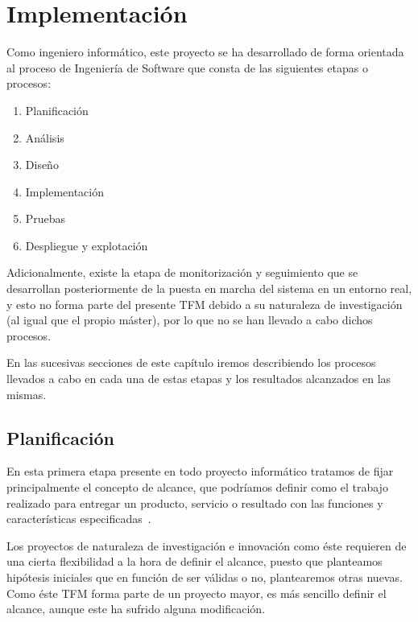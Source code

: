\graphicspath{{capitulos/Capitulo4-Implementacion/recursos/}}

\section{Implementación} \label{capitulo:4}

Como ingeniero informático, este proyecto se ha desarrollado de forma orientada al proceso de Ingeniería de Software que consta de las siguientes etapas o procesos: 
\begin{enumerate}
	\item Planificación
	\item Análisis
	\item Diseño
	\item Implementación%
	\item Pruebas
	\item Despliegue y explotación    
\end{enumerate}
Adicionalmente, existe la etapa de monitorización y seguimiento que se desarrollan posteriormente de la puesta en marcha del sistema en un entorno real, y esto no forma parte del presente TFM debido a su naturaleza de investigación (al igual que el propio máster), por lo que no se han llevado a cabo dichos procesos.

En las sucesivas secciones de este capítulo iremos describiendo los procesos llevados a cabo en cada una de estas etapas y los resultados alcanzados en las mismas. %

\subsection{Planificación}
\label{sec:4:planificacion}
En esta primera etapa presente en todo proyecto informático tratamos de fijar principalmente el concepto de alcance, que podríamos definir como el trabajo realizado para entregar un producto, servicio o resultado con
las funciones y características especificadas~\cite{PMBOK}.

Los proyectos de naturaleza de investigación e innovación como éste requieren de una cierta flexibilidad a la hora de definir el alcance, puesto que planteamos hipótesis iniciales que en función de ser válidas o no, plantearemos otras nuevas. Como éste TFM forma parte de un proyecto mayor, es más sencillo definir el alcance, aunque este ha sufrido alguna modificación.


